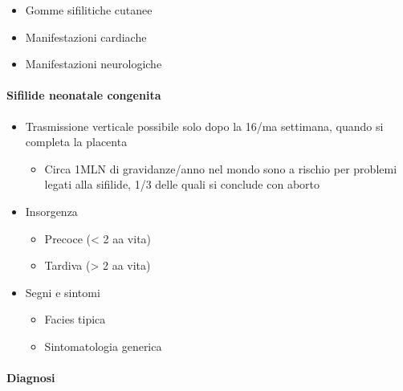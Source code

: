\documentclass[italian,]{article}
\providecommand{\tightlist}{%
  \setlength{\itemsep}{0pt}\setlength{\parskip}{0pt}}
\begin{document}
\begin{enumerate}
  \begin{itemize}
  \tightlist
  \item
    Gomme sifilitiche cutanee
  \item
    Manifestazioni cardiache
  \item
    Manifestazioni neurologiche
  \end{itemize}
\end{enumerate}

\hypertarget{sifilide-neonatale-congenita}{%
\paragraph{Sifilide neonatale
congenita}\label{sifilide-neonatale-congenita}}

\begin{itemize}
\tightlist
\item
  Trasmissione verticale possibile solo dopo la 16/ma settimana, quando
  si completa la placenta

  \begin{itemize}
  \tightlist
  \item
    Circa 1MLN di gravidanze/anno nel mondo sono a rischio per problemi
    legati alla sifilide, 1/3 delle quali si conclude con aborto
  \end{itemize}
\item
  Insorgenza

  \begin{itemize}
  \tightlist
  \item
    Precoce (\textless{} 2 aa vita)
  \item
    Tardiva (\textgreater{} 2 aa vita)
  \end{itemize}
\item
  Segni e sintomi

  \begin{itemize}
  \tightlist
  \item
    Facies tipica
  \item
    Sintomatologia generica
  \end{itemize}
\end{itemize}

\hypertarget{diagnosi}{%
\paragraph{Diagnosi}\label{diagnosi}}
\end{document}
